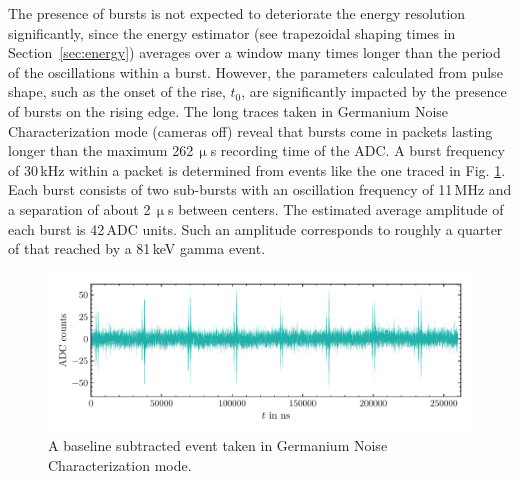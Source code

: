The presence of bursts is not expected to deteriorate the energy resolution significantly, since the energy estimator (see trapezoidal shaping times in Section~\ref{sec:energy}) averages over a window many times longer than the period of the oscillations within a burst. However, the parameters calculated from pulse shape, such as the onset of the rise, $t_{0}$, are significantly impacted by the presence of bursts on the rising edge. The long traces taken in Germanium Noise Characterization mode (cameras off) reveal that bursts come in packets lasting longer than the maximum 262\,$\upmu$s recording time of the ADC. A burst frequency of 30\,kHz within a packet is determined from events like the one traced in Fig. \ref{fig:long_trace}. Each burst consists of two sub-bursts with an oscillation frequency of 11\,MHz and a separation of about 2\,$\upmu$s between centers. The estimated average amplitude of each burst is 42\,ADC units. Such an amplitude corresponds to roughly a quarter of that reached by a \BaS{} 81\,keV gamma event. 
\begin{figure}[htb]
    \centering
	\vspace*{-10pt}
    \includegraphics[width=6in]{figs/param/long_trace_width_6_9in.pdf}
	\vspace*{-10mm}
    \caption{A baseline subtracted event taken in Germanium Noise Characterization mode.}
    \label{fig:long_trace}
	\vspace*{-5pt}
\end{figure} 

